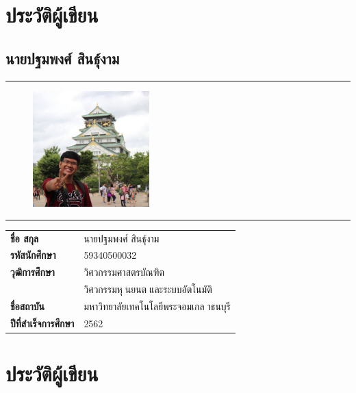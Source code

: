 \clearpage

\chapter*{ประวัติผู้เขียน}
\section*{นายปฐมพงศ์ สินธุ์งาม}
\hrule height .7pt
\begin{figure}[!ht]
	\centering
	\includegraphics[width=0.4\textwidth]{pages/images/feihong.jpg}
\end{figure}
\hrule height .7pt
\raggedright
\begin{tabular}{p{} p{}}
    \textbf{ชื่อ สกุล} & {นายปฐมพงศ์ สินธุ์งาม} \\
    \textbf{รหัสนักศึกษา} & {59340500032}\\
    \textbf{วุฒิการศึกษา} & {วิศวกรรมศาสตรบัณฑิต} \\
    {} & {วิศวกรรมหุนยนตและระบบอัตโนมัติ}\\
    \textbf{ชื่อสถาบัน} & {มหาวิทยาลัยเทคโนโลยีพระจอมเกลาธนบุรี} \\
    \textbf{ปีที่สำเร็จการศึกษา} & {2562} \\
\end{tabular}   

\chapter*{ประวัติผู้เขียน}
